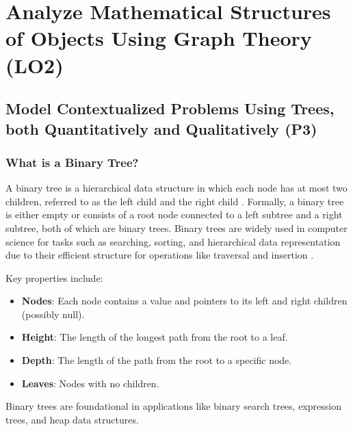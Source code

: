 \documentclass[12pt, a4paper, twoside]{report} %
\begin{document}



\chapter{Analyze Mathematical Structures of Objects Using Graph Theory (LO2)}
\label{chap:LO2}

\section{Model Contextualized Problems Using Trees, both Quantitatively and Qualitatively (P3)}
\label{sec:P3}

\subsection{What is a Binary Tree?}

A binary tree is a hierarchical data structure in which each node has at most two children, referred to as the left child and the right child \cite{epp2020}. Formally, a binary tree is either empty or consists of a root node connected to a left subtree and a right subtree, both of which are binary trees. Binary trees are widely used in computer science for tasks such as searching, sorting, and hierarchical data representation due to their efficient structure for operations like traversal and insertion \cite{rosen2019}.

Key properties include:
\begin{itemize}
  \item \textbf{Nodes}: Each node contains a value and pointers to its left and right children (possibly null).
  \item \textbf{Height}: The length of the longest path from the root to a leaf.
  \item \textbf{Depth}: The length of the path from the root to a specific node.
  \item \textbf{Leaves}: Nodes with no children.
\end{itemize}
Binary trees are foundational in applications like binary search trees, expression trees, and heap data structures.
\end{document}
